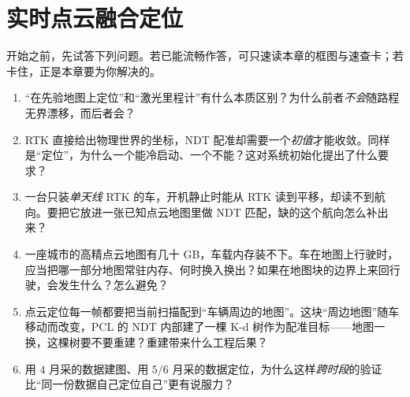 \chapter{实时点云融合定位}
\label{ch:lidar-loc}


\begin{practice}[前置自测]
开始之前，先试答下列问题。若已能流畅作答，可只速读本章的框图与速查卡；若卡住，正是本章要为你解决的。
\begin{enumerate}
  \item “在先验地图上定位”和“激光里程计”有什么本质区别？为什么前者\emph{不会}随路程无界漂移，而后者会？
  \item RTK 直接给出物理世界的坐标，NDT 配准却需要一个\emph{初值}才能收敛。同样是“定位”，为什么一个能冷启动、一个不能？这对系统初始化提出了什么要求？
  \item 一台只装\emph{单天线} RTK 的车，开机静止时能从 RTK 读到平移，却读不到航向。要把它放进一张已知点云地图里做 NDT 匹配，缺的这个航向怎么补出来？
  \item 一座城市的高精点云地图有几十 GB，车载内存装不下。车在地图上行驶时，应当把哪一部分地图常驻内存、何时换入换出？如果在地图块的边界上来回行驶，会发生什么？怎么避免？
  \item 点云定位每一帧都要把当前扫描配到“车辆周边的地图”。这块“周边地图”随车移动而改变，PCL 的 NDT 内部建了一棵 K-d 树作为配准目标——地图一换，这棵树要不要重建？重建带来什么工程后果？
  \item 用 $4$ 月采的数据建图、用 $5/6$ 月采的数据定位，为什么这样\emph{跨时段}的验证比“同一份数据自己定位自己”更有说服力？
\end{enumerate}
\end{practice}

